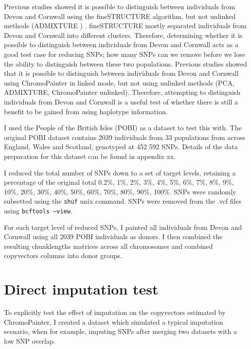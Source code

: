 Previous studies showed it is possible to distinguish between individuals from Devon and Cornwall using the fineSTRUCTURE algorithm, but not unlinked methods (ADMIXTURE \cite{alexander2009fast}) \cite{Leslie2015}. fineSTRUCTURE mostly separated individuals from Devon and Cornwall into different clusters. Therefore, determining whether it is possible to distinguish between individuals from Devon and Cornwall acts as a good test case for reducing SNPs; how many SNPs can we remove before we lose the ability to distinguish between these two populations.
Previous studies showed that it is possible to distinguish between individuals from Devon and Cornwall using ChromoPainter in linked mode, but not using unlinked methods (PCA, ADMIXTURE, ChromoPainter unlinked). Therefore, attempting to distinguish individuals from Devon and Cornwall is a useful test of whether there is still a benefit to be gained from using haplotype information.  

I used the People of the British Isles (POBI) as a dataset to test this with. The original POBI dataset contains 2039 individuals from 33 populations from across England, Wales and Scotland, genotyped at 452 592 SNPs. Details of the data preparation for this dataset can be found in appendix xx.

I reduced the total number of SNPs down to a set of target levels, retaining a percentage of the original total 0.2\%, 1\%, 2\%, 3\%, 4\%, 5\%, 6\%, 7\%, 8\%, 9\%, 10\%, 20\%, 30\%, 40\%, 50\%, 60\%, 70\%, 80\%, 90\%, 100\%. SNPs were randomly subsetted using the \texttt{shuf} unix command. SNPs were removed from the .vcf files using \texttt{bcftools --view}.

For each target level of reduced SNPs, I painted all individuals from Devon and Cornwall using all 2039 POBI individuals as donors. I then combined the resulting chunklengths matrices across all chromosomes and combined copyvectors columns into donor groups.

\section{Direct imputation test}

To explicitly test the effect of imputation on the copyvectors estimated by ChromoPainter, I created a dataset which simulated a typical imputation scenario, when for example, imputing SNPs after merging two datasets with a low SNP overlap.  

